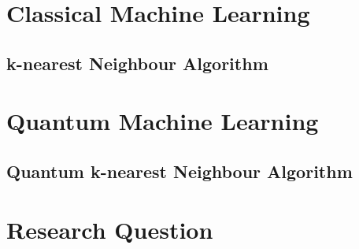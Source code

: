 \section{Classical Machine Learning}
\label{subsec:classicalmachinelearning}

\subsection{k-nearest Neighbour Algorithm}
\label{subsubsec:knearestneighbour}

\section{Quantum Machine Learning}
\label{subsec:quantummachinelearning}

\subsection{Quantum k-nearest Neighbour Algorithm}
\label{subsubsec:quantumknearestneighbour}

\section{Research Question}
\label{subsec:researchquestion}